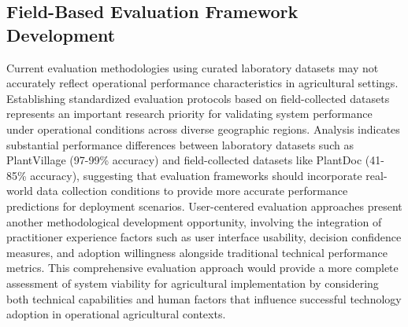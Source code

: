 \documentclass[sn-mathphys]{sn-jnl}
\theoremstyle{thmstyleone}%
\theoremstyle{thmstyletwo}%
\theoremstyle{thmstylethree}%
\begin{document}
\subsection{Field-Based Evaluation Framework Development}
Current evaluation methodologies using curated laboratory datasets may not accurately reflect operational performance characteristics in agricultural settings. Establishing standardized evaluation protocols based on field-collected datasets represents an important research priority for validating system performance under operational conditions across diverse geographic regions. Analysis indicates substantial performance differences between laboratory datasets such as PlantVillage (97-99\% accuracy) and field-collected datasets like PlantDoc (41-85\% accuracy), suggesting that evaluation frameworks should incorporate real-world data collection conditions to provide more accurate performance predictions for deployment scenarios. User-centered evaluation approaches present another methodological development opportunity, involving the integration of practitioner experience factors such as user interface usability, decision confidence measures, and adoption willingness alongside traditional technical performance metrics. This comprehensive evaluation approach would provide a more complete assessment of system viability for agricultural implementation by considering both technical capabilities and human factors that influence successful technology adoption in operational agricultural contexts.
\end{document}
